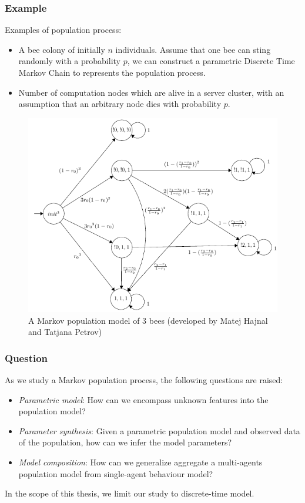 \documentclass{beamer}
\begin{document}
\begin{frame}
  \frametitle{Example}
  Examples of population process:
  \begin{itemize}
    \item A bee colony of initially $n$ individuals. Assume that one bee can sting
          randomly with a probability $p$, we can construct a parametric Discrete
          Time Markov Chain to represents the population process.
    \item Number of computation nodes which are alive in a server cluster, with an
          assumption that an arbitrary node dies with probability $p$.
  \end{itemize}
  \begin{figure}[t]
    \includegraphics[height=0.5\textheight]{3bees.png} \centering
    \caption{A Markov population model of 3 bees (developed by Matej Hajnal and
      Tatjana Petrov)}
  \end{figure}
\end{frame}

\begin{frame}
  \frametitle{Question}
  As we study a Markov population process, the following questions are raised:
  \begin{itemize}
    \item \textit{Parametric model}: How can we encompass unknown features into
          the population model?
    \item \textit{Parameter synthesis}: Given a parametric population model and
          observed data of the population, how can we infer the model parameters?
    \item \textit{Model composition}: How can we generalize aggregate a
          multi-agents population model from single-agent behaviour model?
  \end{itemize}
  In the scope of this thesis, we limit our study to discrete-time model.
\end{frame}
\end{document}
